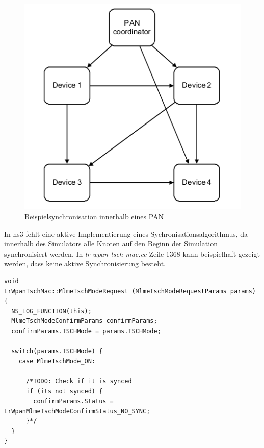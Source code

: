 \begin{figure}[h]
    \centering
    \includegraphics[scale=0.6]{images/pan_synchronisation.png}
    \caption{Beispielsynchronisation innerhalb eines PAN \cite{IEEE802154e}}
    \label{fig:pan_synchronisation}
\end{figure}

In ns3 fehlt eine aktive Implementierung eines Sychronisationsalgorithmus, da
innerhalb des Simulators alle Knoten auf den Beginn der Simulation synchronisiert
werden. In \textit{lr-wpan-tsch-mac.cc} Zeile 1368 kann beispielhaft gezeigt werden,
dass keine aktive Synchronisierung besteht.


\begin{lstlisting}[frame=single]
void
LrWpanTschMac::MlmeTschModeRequest (MlmeTschModeRequestParams params)
{
  NS_LOG_FUNCTION(this);
  MlmeTschModeConfirmParams confirmParams;
  confirmParams.TSCHMode = params.TSCHMode;

  switch(params.TSCHMode) {
    case MlmeTschMode_ON:

      /*TODO: Check if it is synced
      if (its not synced) {
        confirmParams.Status = LrWpanMlmeTschModeConfirmStatus_NO_SYNC;
      }*/
  }
}

\end{lstlisting}
